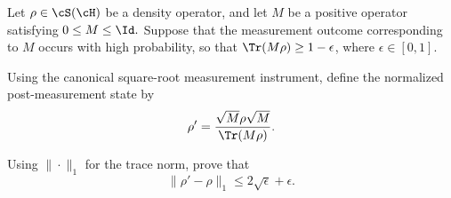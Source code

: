 Let $\rho\in \cS(\cH)$ be a density operator, and let $M$ be a positive operator satisfying $0\leq M\leq \Id.$ Suppose that the measurement outcome corresponding to $M$ occurs with high probability, so that $\Tr(M\rho)\geq 1-\epsilon$, where $\epsilon\in [0,1]$.

Using the canonical square-root measurement instrument, define the normalized post-measurement state by
$$
\rho'
=
\frac{\sqrt{M}\rho\sqrt{M}}{\Tr(M\rho)}.
$$

Using $\|\cdot\|_1$ for the trace norm, prove that
$$
\|\rho'-\rho\|_1
\leq
2\sqrt{\epsilon}+\epsilon.
$$
